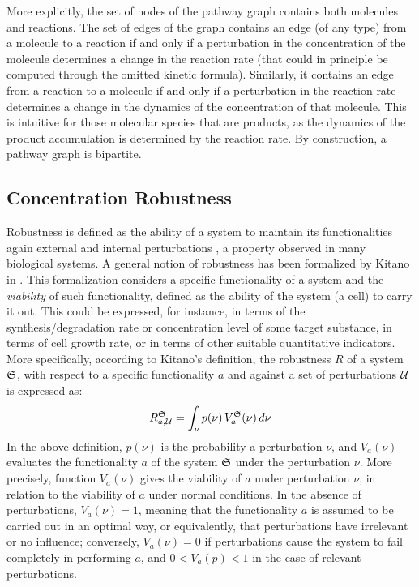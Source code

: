 More explicitly, the set of nodes of the pathway graph contains both molecules and reactions. The set of edges of the graph contains an edge (of any type) from a molecule to a reaction if and only if a perturbation in the concentration of the molecule determines a change in the reaction rate (that could in principle be computed through the omitted kinetic formula). Similarly, it contains an edge from a reaction to a molecule if and only if a perturbation in the reaction rate determines a change in the dynamics of the concentration of that molecule. This is intuitive for those molecular species that are products, as the dynamics of the product accumulation is determined by the reaction rate. By construction, a pathway graph is bipartite.

\subsection{Concentration Robustness}\label{sec:robustness}
Robustness is defined as the ability of a system to maintain its functionalities again external and internal perturbations \citep{kitano2004biological}, a property observed in many biological systems. A general notion of robustness has been formalized by Kitano in \cite{kitano2007towards}. This formalization considers a specific functionality of a system and the \emph{viability} of such functionality, defined as the ability of the system (\eg a cell) to carry it out. This could be expressed, for instance, in terms of the synthesis/degradation rate or concentration level of some target substance, in terms of cell growth rate, or in terms of  other suitable quantitative indicators. More specifically, according to Kitano's definition, the robustness $R$ of a system $\mathfrak{S}$, with respect to a specific functionality $a$ and against a set of perturbations $\Cal{U}$ is expressed as:
\[
 R^{\System}_{a,\Cal{U}} = \int_{\nu} p(\nu)\, V_a^{\System}(\nu)\,d\nu
\]
In the above definition, $p(\nu)$ is the probability a perturbation $\nu$, and $V_a(\nu)$ evaluates the functionality $a$ of the system $\mathfrak{S}$ under the perturbation $\nu$. More precisely, function $V_a(\nu)$ gives the viability of $a$ under perturbation $\nu$, in relation to the viability of $a$ under normal conditions. In the absence of perturbations, $V_a(\nu)=1$, meaning that the functionality $a$ is assumed to be carried out in an optimal way, or equivalently, that perturbations have irrelevant or no influence; conversely, $V_a(\nu) = 0$ if perturbations cause the system to fail completely in performing $a$, and $0 < V_a(p) < 1$ in the case of relevant perturbations.

